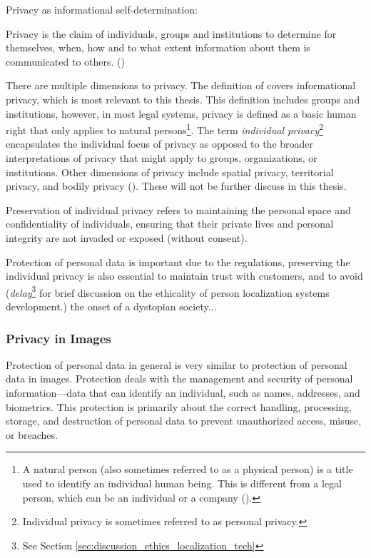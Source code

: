 Privacy as informational self-determination:

\begin{myquote}
    Privacy is the claim of individuals, groups and institutions to determine for themselves, when, how and to what extent information about them is communicated to others. (\cite{we1967privacydefinition})
\end{myquote}

There are multiple dimensions to privacy. The definition of \citeauthor{we1967privacydefinition} covers informational privacy, which is most relevant to this thesis. This definition includes groups and institutions, however, in most legal systems, privacy is defined as a basic human right that only applies to natural persons\footnote{A natural person (also sometimes referred to as a physical person) is a title used to identify an individual human being. This is different from a legal person, which can be an individual or a company (\cite{te2023naturalperson}).}. The term \textit{individual privacy}\footnote{Individual privacy is sometimes referred to as personal privacy.} encapsulates the individual focus of privacy as opposed to the broader interpretations of privacy that might apply to groups, organizations, or institutions. Other dimensions of privacy include spatial privacy, territorial privacy, and bodily privacy (\cite{fi2017privacybookchapter53}). These will not be further discuss in this thesis.

Preservation of individual privacy refers to maintaining the personal space and confidentiality of individuals, ensuring that their private lives and personal integrity are not invaded or exposed (without consent). 

Protection of personal data is important due to the regulations, preserving the individual privacy is also essential to maintain trust with customers, and to avoid (\textit{delay}\footnote{See Section \ref{sec:discussion_ethics_localization_tech}} for brief discussion on the ethicality of person localization systems development.) the onset of a dystopian society...

\newpage
\subsubsection{Privacy in Images}
\label{sec:preservation_individual_privacy_in_images}
Protection of personal data in general is very similar to protection of personal data in images. Protection deals with the management and security of personal information—data that can identify an individual, such as names, addresses, and biometrics. This protection is primarily about the correct handling, processing, storage, and destruction of personal data to prevent unauthorized access, misuse, or breaches. 

